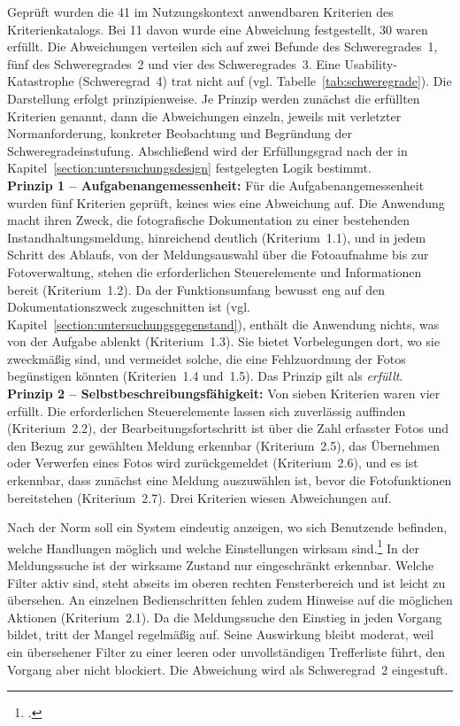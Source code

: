 Geprüft wurden die 41 im Nutzungskontext anwendbaren Kriterien des
Kriterienkatalogs.
Bei 11 davon wurde eine Abweichung festgestellt, 30 waren erfüllt.
Die Abweichungen verteilen sich auf zwei Befunde des Schweregrades~1, fünf des
Schweregrades~2 und vier des Schweregrades~3.
Eine Usability-Katastrophe (Schweregrad~4) trat nicht auf
(vgl. Tabelle~\ref{tab:schweregrade}).
Die Darstellung erfolgt prinzipienweise.
Je Prinzip werden zunächst die erfüllten Kriterien genannt, dann die Abweichungen
einzeln, jeweils mit verletzter Normanforderung, konkreter Beobachtung und
Begründung der Schweregradeinstufung.
Abschließend wird der Erfüllungsgrad nach der in
Kapitel~\ref{section:untersuchungsdesign} festgelegten Logik bestimmt.\\
\textbf{Prinzip 1 -- Aufgabenangemessenheit:}
Für die Aufgabenangemessenheit wurden fünf Kriterien geprüft, keines wies eine
Abweichung auf.
Die Anwendung macht ihren Zweck, die fotografische Dokumentation zu einer
bestehenden Instandhaltungsmeldung, hinreichend deutlich (Kriterium~1.1), und in
jedem Schritt des Ablaufs, von der Meldungsauswahl über die Fotoaufnahme bis zur
Fotoverwaltung, stehen die erforderlichen Steuerelemente und Informationen bereit
(Kriterium~1.2).
Da der Funktionsumfang bewusst eng auf den Dokumentationszweck zugeschnitten ist
(vgl. Kapitel~\ref{section:untersuchungsgegenstand}), enthält die Anwendung
nichts, was von der Aufgabe ablenkt (Kriterium~1.3).
Sie bietet Vorbelegungen dort, wo sie zweckmäßig sind, und vermeidet solche, die
eine Fehlzuordnung der Fotos begünstigen könnten (Kriterien~1.4 und~1.5).
Das Prinzip gilt als \emph{erfüllt}.\\
\textbf{Prinzip 2 -- Selbstbeschreibungsfähigkeit:}
Von sieben Kriterien waren vier erfüllt.
Die erforderlichen Steuerelemente lassen sich zuverlässig auffinden
(Kriterium~2.2), der Bearbeitungsfortschritt ist über die Zahl erfasster Fotos
und den Bezug zur gewählten Meldung erkennbar (Kriterium~2.5), das Übernehmen
oder Verwerfen eines Fotos wird zurückgemeldet (Kriterium~2.6), und es ist
erkennbar, dass zunächst eine Meldung auszuwählen ist, bevor die Fotofunktionen
bereitstehen (Kriterium~2.7).
Drei Kriterien wiesen Abweichungen auf.
\newpage

Nach der Norm soll ein System eindeutig anzeigen, wo sich Benutzende befinden,
welche Handlungen möglich und welche Einstellungen wirksam
sind.\footcite[Vgl.][Abschnitt~5.2.2.2]{DIN_ISO_9241-110:2020}
In der Meldungssuche ist der wirksame Zustand nur eingeschränkt erkennbar.
Welche Filter aktiv sind, steht abseits im oberen rechten Fensterbereich und ist
leicht zu übersehen.
An einzelnen Bedienschritten fehlen zudem Hinweise auf die möglichen Aktionen
(Kriterium~2.1).
Da die Meldungssuche den Einstieg in jeden Vorgang bildet, tritt der Mangel
regelmäßig auf.
Seine Auswirkung bleibt moderat, weil ein übersehener Filter zu einer leeren oder
unvollständigen Trefferliste führt, den Vorgang aber nicht blockiert.
Die Abweichung wird als Schweregrad~2 eingestuft.

